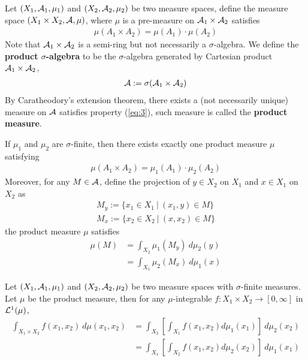 \documentclass[11pt]{article}
\numberwithin{equation}{section}
\newcommand{\s}[0]{$\sigma$}
\begin{document}
    \begin{definition}
    	Let $(X_1, \mathcal{{A}}_1, \mu_1)$ and $(X_2, \mathcal{{A}}_2, \mu_2)$ be two measure spaces, define the measure space $(X_1 \times X_2, \mathcal{{A}}, \mu)$, where $\mu$ is a pre-measure on $\mathcal{{A}}_1 \times \mathcal{{A}}_2$ satisfies 
    	\begin{align}
    		\mu(A_1 \times A_2) = \mu(A_1) \cdot \mu(A_2) \label{eq:3}
    	\end{align}
    	Note that $\mathcal{{A}}_1 \times \mathcal{{A}}_2$ is a semi-ring but not necessarily a \s-algebra.
    	We define the \textbf{product \s-algebra} to be the \s-algebra generated by Cartesian product $\mathcal{{A}}_1 \times \mathcal{{A}}_2$,
    	\begin{align}
    		\mathcal{{A}} := \sigma (\mathcal{{A}}_1 \times \mathcal{{A}}_2)
    	\end{align}
    	By Caratheodory's extension theorem, there exists a (not necessarily unique) measure on $\mathcal{{A}}$ satisfies property (\ref{eq:3}), such measure is called the \textbf{product measure}.
    \end{definition}
    
    \begin{proposition}
    	If $\mu_1$ and $\mu_2$ are \s-finite, then there exists exactly one product measure $\mu$ satisfying
    	\begin{align}
    		\mu(A_1 \times A_2) = \mu_1(A_1) \cdot \mu_2(A_2)
    	\end{align}
    	Moreover, for any $M \in \mathcal{{A}}$, define the projection of $y \in X_2$ on $X_1$  and $x \in X_1$ on $X_2$ as
    	\begin{align}
    		M_y := \{x_1 \in X_1\ |\ (x_1, y) \in M\} \\
    		M_x := \{x_2 \in X_2\ |\ (x, x_2) \in M\}
    	\end{align}
		the product measure $\mu$ satisfies
    	\begin{align}
    		\mu(M) &= \int_{X_2} \mu_1(M_y)\ d\mu_2(y) \\
    		&= \int_{X_1} \mu_2(M_x)\ d\mu_1(x)
    	\end{align}
    \end{proposition}
    
    \begin{theorem}
    	Let $(X_1, \mathcal{{A}}_1, \mu_1)$ and $(X_2, \mathcal{{A}}_2, \mu_2)$ be two measure spaces with \s-finite measures. Let $\mu$ be the product measure, then for any $\mu$-integrable $f: X_1 \times X_2 \to [0, \infty]$ in  $\mathcal{{L}}^1(\mu)$,
    	\begin{align}
    		\int_{X_1 \times X_2} f(x_1, x_2)\ d\mu(x_1, x_2)
    		&= \int_{X_2} \left[ \int_{X_1} f(x_1, x_2) d\mu_1(x_1) \right] \ d\mu_2(x_2) \\
    		&= \int_{X_1} \left[ \int_{X_2} f(x_1, x_2) d\mu_2(x_2) \right] \ d\mu_1(x_1)
    	\end{align}
    \end{theorem}
    
\end{document}
